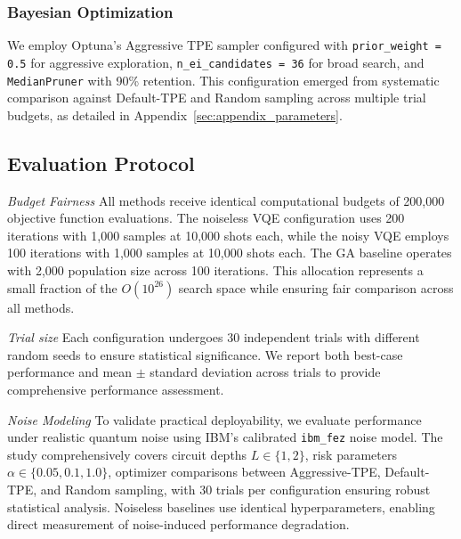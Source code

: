 \subsubsection{Bayesian Optimization}
We employ Optuna's Aggressive TPE sampler configured with \texttt{prior\_weight = 0.5} for aggressive exploration, \texttt{n\_ei\_candidates = 36} for broad search, and \texttt{MedianPruner} with 90\% retention. This configuration emerged from systematic comparison against Default-TPE and Random sampling across multiple trial budgets, as detailed in Appendix~\ref{sec:appendix_parameters}.

\subsection{Evaluation Protocol}

\textit{Budget Fairness}
All methods receive identical computational budgets of 200,000 objective function evaluations. The noiseless VQE configuration uses 200 iterations with 1,000 samples at 10,000 shots each, while the noisy VQE employs 100 iterations with 1,000 samples at 10,000 shots each. The GA baseline operates with 2,000 population size across 100 iterations. This allocation represents a small fraction of the $O(10^{26})$ search space while ensuring fair comparison across all methods.

\textit{Trial size} Each configuration undergoes 30 independent trials with different random seeds to ensure statistical significance. We report both best-case performance and mean $\pm$ standard deviation across trials to provide comprehensive performance assessment.

\textit{Noise Modeling} To validate practical deployability, we evaluate performance under realistic quantum noise using IBM's calibrated \texttt{ibm\_fez} noise model. The study comprehensively covers circuit depths $L \in \{1, 2\}$, risk parameters $\alpha \in \{0.05, 0.1, 1.0\}$, optimizer comparisons between Aggressive-TPE, Default-TPE, and Random sampling, with 30 trials per configuration ensuring robust statistical analysis. Noiseless baselines use identical hyperparameters, enabling direct measurement of noise-induced performance degradation.